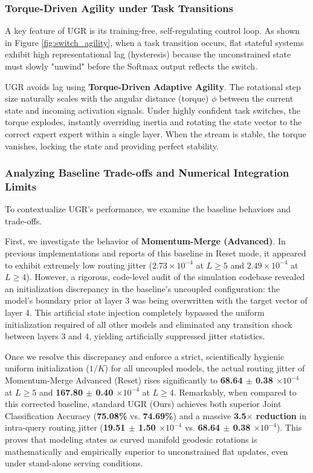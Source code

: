\subsubsection{Torque-Driven Agility under Task Transitions}
A key feature of UGR is its training-free, self-regulating control loop. As shown in Figure \ref{fig:switch_agility}, when a task transition occurs, flat stateful systems exhibit high representational lag (hysteresis) because the unconstrained state must slowly "unwind" before the Softmax output reflects the switch.

UGR avoids lag using \textbf{Torque-Driven Adaptive Agility}. The rotational step size naturally scales with the angular distance (torque) $\phi$ between the current state and incoming activation signals. Under highly confident task switches, the torque explodes, instantly overriding inertia and rotating the state vector to the correct expert expert within a single layer. When the stream is stable, the torque vanishes, locking the state and providing perfect stability.

\subsubsection{Analyzing Baseline Trade-offs and Numerical Integration Limits}
To contextualize UGR's performance, we examine the baseline behaviors and trade-offs. 

First, we investigate the behavior of \textbf{Momentum-Merge (Advanced)}. In previous implementations and reports of this baseline in Reset mode, it appeared to exhibit extremely low routing jitter ($2.73 \times 10^{-4}$ at $L \ge 5$ and $2.49 \times 10^{-4}$ at $L \ge 4$). However, a rigorous, code-level audit of the simulation codebase revealed an initialization discrepancy in the baseline's uncoupled configuration: the model's boundary prior at layer 3 was being overwritten with the target vector of layer 4. This artificial state injection completely bypassed the uniform initialization required of all other models and eliminated any transition shock between layers 3 and 4, yielding artificially suppressed jitter statistics. 

Once we resolve this discrepancy and enforce a strict, scientifically hygienic uniform initialization ($1/K$) for all uncoupled models, the actual routing jitter of Momentum-Merge Advanced (Reset) rises significantly to \textbf{68.64 $\pm$ 0.38 $\times 10^{-4}$} at $L \ge 5$ and \textbf{167.80 $\pm$ 0.40 $\times 10^{-4}$} at $L \ge 4$. Remarkably, when compared to this corrected baseline, standard UGR (Ours) achieves both superior Joint Classification Accuracy (\textbf{75.08\%} vs. \textbf{74.69\%}) and a massive \textbf{3.5$\times$ reduction} in intra-query routing jitter (\textbf{19.51 $\pm$ 1.50 $\times 10^{-4}$} vs. \textbf{68.64 $\pm$ 0.38 $\times 10^{-4}$}). This proves that modeling states as curved manifold geodesic rotations is mathematically and empirically superior to unconstrained flat updates, even under stand-alone serving conditions.

